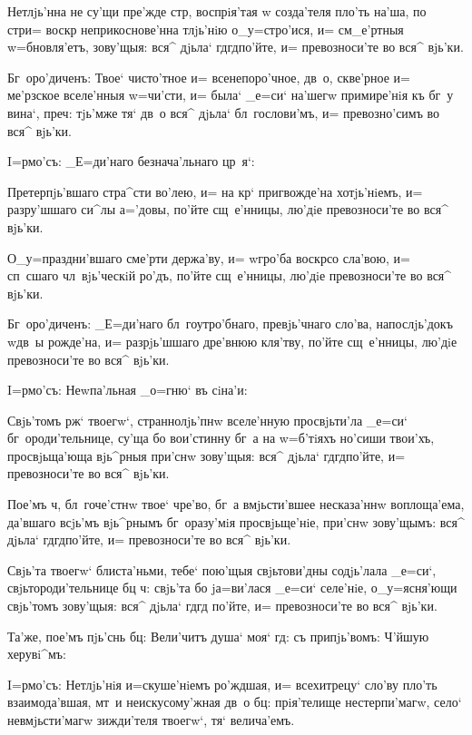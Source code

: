 Нетлjь'нна не су'щи пре'жде стр, воспрiя'тая w\т 
созда'теля пло'ть на'ша, по стр и= воскр 
неприкоснове'нна тлjь'нiю о_у=стро'ися, и= см_е'ртныя 
w=бновля'етъ, зову'щыя: вся^ дjьла` гд гд по'йте, 
и= превозноси'те во вся^ вjь'ки.

Бг~оро'диченъ: Твое` чисто'тное и= всенепоро'чное, 
дв~о, скве'рное и= ме'рзское вселе'нныя w=чи'сти, и= 
была` _е=си` на'шегw примире'нiя къ бг~у вина`, 
преч: тjь'мже тя` дв~о вся^ дjьла` бл~гослови'мъ, и= 
превозно'симъ во вся^ вjь'ки.

 I=рмо'съ: _Е=ди'наго безнача'льнаго цр~я`:

Претерпjь'вшаго стра^сти во'лею, и= на кр` 
пригвожде'на хотjь'нiемъ, и= разру'шшаго си^лы а='довы, 
по'йте сщ~е'нницы, лю'дiе превозноси'те во вся^ вjь'ки.

О_у=праздни'вшаго сме'рти держа'ву, и= w\т гро'ба 
воскр со сла'вою, и= сп~сшаго чл~вjь'ческiй ро'дъ, 
по'йте сщ~е'нницы, лю'дiе превозноси'те во вся^ вjь'ки.

Бг~оро'диченъ: _Е=ди'наго бл~гоутро'бнаго, 
превjь'чнаго сло'ва, напослjь'докъ w\т дв~ы рожде'на, и= 
разрjь'шшаго дре'внюю кля'тву, по'йте сщ~е'нницы, лю'дiе 
превозноси'те во вся^ вjь'ки.

 I=рмо'съ: Неwпа'льная _о=гню` въ сiна'и:

Свjь'томъ рж` твоегw`, страннолjь'пнw вселе'нную 
просвjьти'ла _е=си` бг~ороди'тельнице, су'ща бо 
вои'стинну бг~а на w=б'тiяхъ но'сиши твои'хъ, 
просвjьща'юща вjь^рныя при'снw зову'щыя: вся^ дjьла` 
гд гд по'йте, и= превозноси'те во вся^ вjь'ки.

Пое'мъ ч, бл~гоче'стнw твое` чре'во, бг~а 
вмjьсти'вшее несказа'ннw воплоща'ема, да'вшаго всjь'мъ 
вjь^рнымъ бг~оразу'мiя просвjьще'нiе, при'снw зову'щымъ: 
вся^ дjьла` гд гд по'йте, и= превозноси'те во вся^ 
вjь'ки.

Свjь'та твоегw` блиста'ньми, тебе` пою'щыя 
свjьтови'дны содjь'лала _е=си`, свjьтороди'тельнице бц 
ч: свjь'та бо jа=ви'лася _е=си` селе'нiе, 
о_у=ясня'ющи свjь'томъ зову'щыя: вся^ дjьла` гд гд 
по'йте, и= превозноси'те во вся^ вjь'ки.

Та'же, пое'мъ пjь'снь бц: Вели'читъ душа` моя` 
гд: съ припjь'вомъ: Ч'йшую херувi^мъ:


I=рмо'съ: Нетлjь'нiя и=скуше'нiемъ ро'ждшая, и= 
всехитрецу` сло'ву пло'ть взаимода'вшая, мт~и 
неискусому'жная дв~о бц: прiя'телище нестерпи'магw, 
село` невмjьсти'магw зижди'теля твоегw`, тя` велича'емъ.

